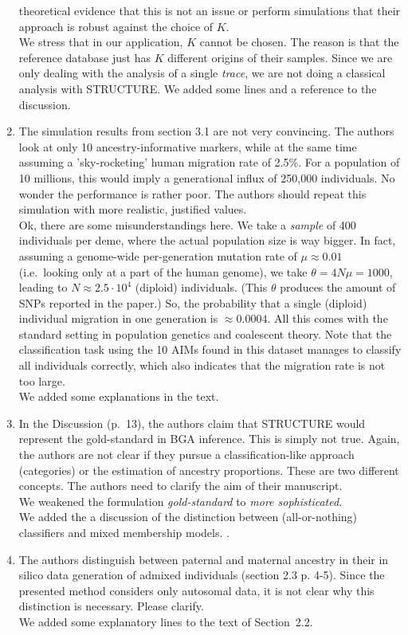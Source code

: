 \documentclass[12pt]{article}
\theoremstyle{definition}
\begin{document}
\begin{enumerate}
  theoretical evidence that this is not an issue or perform
  simulations that their approach is robust against the choice of $K$.
  \\
  {\color{blue} We stress that in our application, $K$ cannot be
    chosen. The reason is that the reference database just has $K$
    different origins of their samples. Since we are only dealing with
    the analysis of a single {\em trace}, we are not doing a classical
    analysis with {\sc STRUCTURE}. We added some lines and a reference
    to the discussion.}
\item The simulation results from section 3.1 are not very
  convincing. The authors look at only 10 ancestry-informative
  markers, while at the same time assuming a 'sky-rocketing' human
  migration rate of 2.5\%. For a population of 10 millions, this would
  imply a generational influx of 250,000 individuals. No wonder the
  performance is rather poor. The authors should repeat this
  simulation with more realistic, justified values.
  \\
  {\color{blue} Ok, there are some misunderstandings here. We take a
    {\it sample} of 400 individuals per deme, where the actual
    population size is way bigger. In fact, assuming a genome-wide
    per-generation mutation rate of $\mu \approx 0.01$ (i.e.\ looking
    only at a part of the human genome), we take
    $\theta = 4N\mu = 1000$, leading to $N\approx 2.5\cdot 10^4$
    (diploid) individuals. (This $\theta$ produces the amount of SNPs
    reported in the paper.) So, the probability that a single
    (diploid) individual migration in one generation is
    $\approx 0.0004$. All this comes with the standard setting in
    population genetics and coalescent theory. Note that the
    classification task using the 10 AIMs found in this dataset
    manages to classify all individuals correctly, which also
    indicates that the migration rate is not too large. \\ We added
    some explanations in the text.}
\item In the Discussion (p.\  13), the authors claim that STRUCTURE would represent the gold-standard in BGA inference. This is simply
  not true. Again, the authors are not clear if they pursue a
  classification-like approach (categories) or the estimation of
  ancestry proportions. These are two different concepts. The authors
  need to clarify the aim of their manuscript.
  \\
  {\color{blue} We weakened the formulation {\em gold-standard} to {\em more sophisticated}. \\ We added the a discussion of the distinction between
    (all-or-nothing) classifiers and mixed membership models. .}
\item The authors distinguish between paternal and maternal ancestry
  in their in silico data generation of admixed individuals (section
  2.3 p. 4-5). Since the presented method considers only autosomal
  data, it is not clear why this distinction is necessary. Please
  clarify.
  \\
  {\color{blue}We added some explanatory lines to the text of Section~2.2. }

\end{enumerate}
\end{document}
